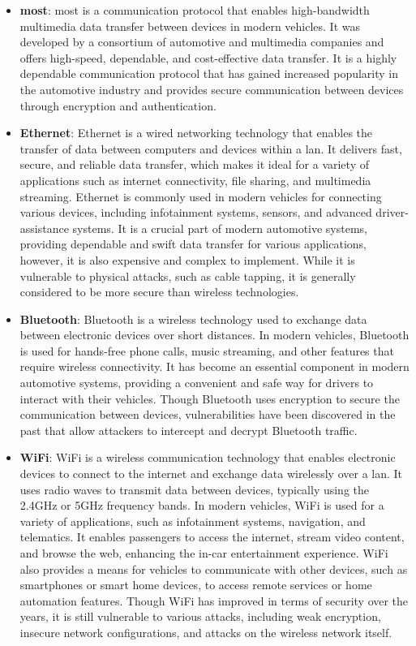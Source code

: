 \begin{itemize}
    \item \textbf{\acrlong{most}}: \acrshort{most} is a communication protocol that enables high-bandwidth multimedia data transfer between devices in modern vehicles. 
    It was developed by a consortium of automotive and multimedia companies and offers high-speed, dependable, and cost-effective data transfer.
    It is a highly dependable communication protocol that has gained increased popularity in the automotive industry and
    provides secure communication between devices through encryption and authentication.

    \item \textbf{Ethernet}: Ethernet is a wired networking technology that enables the transfer of data between computers and devices within a \acrshort{lan}.
    It delivers fast, secure, and reliable data transfer, which makes it ideal for a variety of applications such as internet connectivity, file sharing, and multimedia streaming.
    Ethernet is commonly used in modern vehicles for connecting various devices, including infotainment systems, sensors, and advanced driver-assistance systems. 
    It is a crucial part of modern automotive systems, providing dependable and swift data transfer for various applications, however, it is also expensive and complex to implement.
    While it is vulnerable to physical attacks, such as cable tapping, it is generally considered to be more secure than wireless technologies.

    \item \textbf{Bluetooth}: Bluetooth is a wireless technology used to exchange data between electronic devices over short distances.
    In modern vehicles, Bluetooth is used for hands-free phone calls, music streaming, and other features that require wireless connectivity. 
    It has become an essential component in modern automotive systems, providing a convenient and safe way for drivers to interact with their vehicles.
    Though Bluetooth uses encryption to secure the communication between devices, vulnerabilities have been discovered in the past that allow attackers to intercept and decrypt Bluetooth traffic.

    \item \textbf{WiFi}: WiFi is a wireless communication technology that enables electronic devices to connect to the internet and exchange data wirelessly over a \acrshort{lan}.
    It uses radio waves to transmit data between devices, typically using the 2.4GHz or 5GHz frequency bands.
    In modern vehicles, WiFi is used for a variety of applications, such as infotainment systems, navigation, and telematics. 
    It enables passengers to access the internet, stream video content, and browse the web, enhancing the in-car entertainment experience. 
    WiFi also provides a means for vehicles to communicate with other devices, such as smartphones or smart home devices, to access remote services or home automation features.
    Though WiFi has improved in terms of security over the years, it is still vulnerable to various attacks, including weak encryption, insecure network configurations, and attacks on the wireless network itself.
    

\end{itemize}
